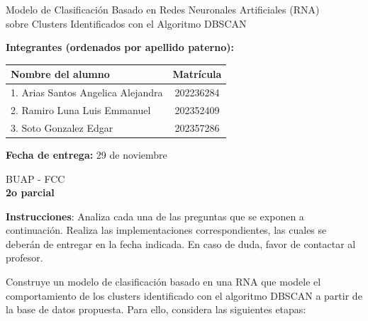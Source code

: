\documentclass[12pt,a4paper]{article}
\begin{document}
\begin{titlepage}
\begin{center}
        {\large
        Modelo de Clasificación Basado en Redes Neuronales Artificiales (RNA)\\
        sobre Clusters Identificados con el Algoritmo DBSCAN
        }

        \vspace{2.2cm}

        \textbf{Integrantes (ordenados por apellido paterno):}\\[0.5cm]
        \begin{tabular}{@{} p{8.8cm} c @{}}
            \toprule
            \textbf{Nombre del alumno} & \textbf{Matrícula} \\
            \midrule
            1. Arias Santos Angelica Alejandra & 202236284 \\[0.25cm]
            2. Ramiro Luna Luis Emmanuel & 202352409 \\[0.25cm]
            3. Soto Gonzalez Edgar & 202357286 \\
            \bottomrule
        \end{tabular}

        \vfill

        \textbf{Fecha de entrega:} 29 de noviembre
    \end{center}
\end{titlepage}

\begin{center}
    BUAP - FCC \\
    \textbf{2o parcial}
\end{center}

\vspace{0.4cm}

{\footnotesize
\noindent \textbf{Instrucciones}: Analiza cada una de las preguntas que se exponen a continuación. Realiza las implementaciones correspondientes, las cuales se deberán de entregar en la fecha indicada. En caso de duda, favor de contactar al profesor.
}

\vspace{0.35cm}

\noindent Construye un modelo de clasificación basado en una RNA que modele el comportamiento de los clusters identificado con el algoritmo DBSCAN a partir de la base de datos propuesta. Para ello, considera las siguientes etapas:
\end{document}
